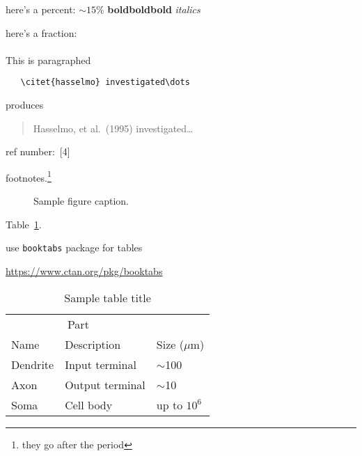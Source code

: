 \documentclass{article}
\begin{document}
here's a percent: $\sim$$15\%$
\textbf{boldboldbold}
\emph{italics}

here's a fraction: 

\paragraph{}This is paragraphed
\begin{verbatim}
   \citet{hasselmo} investigated\dots
\end{verbatim}
produces
\begin{quote}
  Hasselmo, et al.\ (1995) investigated\dots
\end{quote}

ref number:\ [4]

footnotes.\footnote{they go after the period}

\begin{figure}[h]
  \centering
  \fbox{\rule[-.5cm]{0cm}{4cm} \rule[-.5cm]{4cm}{0cm}}
  \caption{Sample figure caption.}
\end{figure}

Table~\ref{sample-table}.

use \verb+booktabs+ package for tables
\begin{center}
  \url{https://www.ctan.org/pkg/booktabs}
\end{center}

\begin{table}[t]
  \caption{Sample table title}
  \label{sample-table}
  \centering
  \begin{tabular}{lll}
    \toprule
    \multicolumn{2}{c}{Part}                   \\
    \cmidrule{1-2}
    Name     & Description     & Size ($\mu$m) \\
    \midrule
    Dendrite & Input terminal  & $\sim$100     \\
    Axon     & Output terminal & $\sim$10      \\
    Soma     & Cell body       & up to $10^6$  \\
    \bottomrule
  \end{tabular}
\end{table}
\end{document}

